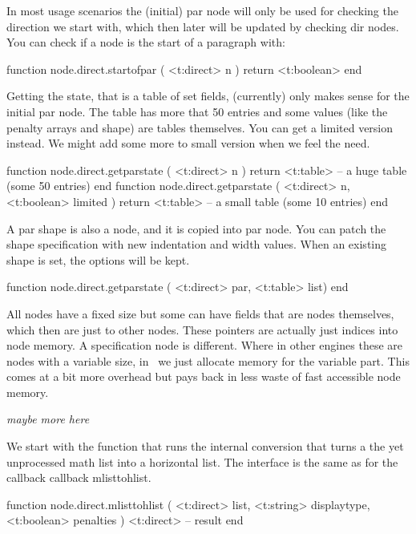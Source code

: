 In most usage scenarios the (initial) par node will only be used for checking the
direction we start with, which then later will be updated by checking dir nodes. You can
check if a node is the start of a paragraph with:

\starttyping[option=LUA]
function node.direct.startofpar ( <t:direct> n ) return <t:boolean> end
\stoptyping

Getting the state, that is a table of set fields, (currently) only makes sense
for the initial par node. The table has more that 50 entries and some values
(like the penalty arrays and shape) are tables themselves. You can get a limited
version instead. We might add some more to small version when we feel the need.

\starttyping[option=LUA]
function node.direct.getparstate (
    <t:direct> n
)
    return <t:table> -- a huge table (some 50 entries)
end
function node.direct.getparstate (
    <t:direct>  n,
    <t:boolean> limited
)
    return <t:table> -- a small table (some 10 entries)
end
\stoptyping

A par shape is also a node, and it is copied into par node. You can patch the
shape specification with new indentation and width values. When an existing shape
is set, the options will be kept.

\starttyping[option=LUA]
function node.direct.getparstate ( <t:direct> par, <t:table> list) end
\stoptyping

\stopsubsection

\startsubsection[title={Specifications}]

All nodes have a fixed size but some can have fields that are nodes themselves,
which then are just  to other nodes. These pointers are actually
just indices into node memory. A specification node is different. Where in other
engines these are nodes with a variable size, in \LUAMETATEX\ we just allocate
memory for the variable part. This comes at a bit more overhead but pays back in
less waste of fast accessible node memory.

{\em maybe more here}

\stopsubsection

\startsubsection[title={Math}]

We start with the function that runs the internal 
conversion that turns a the yet unprocessed math list into a horizontal list. The
interface is the same as for the callback callback {mlisttohlist}.

\starttyping[option=LUA]
function node.direct.mlisttohlist (
    <t:direct>  list,
    <t:string>  displaytype,
    <t:boolean> penalties
)
   <t:direct> -- result
end
\stoptyping

